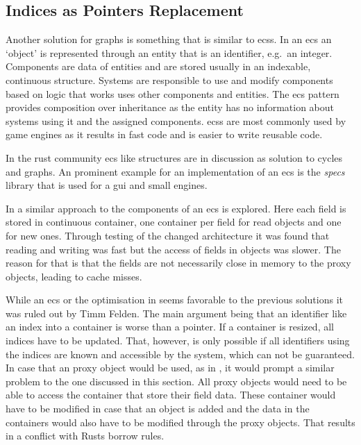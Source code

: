 \documentclass[thesis]{subfiles}
\begin{document}
  \subsection{Indices as Pointers Replacement}
    Another solution for graphs is something that is similar to \glspl{ecs}.
    In an \gls{ecs} an `object' is represented through an entity that is an identifier, e.g.~an integer.
    Components are data of entities and are stored usually in an indexable, continuous structure.
    Systems are responsible to use and modify components based on logic that works uses other components and entities.\autocite[209]{sfml}
    The \gls{ecs} pattern provides composition over inheritance as the entity has no information about systems using it and the assigned components.
    \glspl{ecs} are most commonly used by game engines as it results in fast code and is easier to write reusable code\autocites[209]{sfml}{ecs-acc-game}{ecs-hash}.

    In the rust community \gls{ecs} like structures are in discussion as solution to cycles and graphs\autocites{rust-graph-r4cpp}{rust-graph-leipzig}{rust-graph-niko}{rust-graph-exyr}.
    An prominent example for an implementation of an \gls{ecs} is the \emph{specs}\autocite{rust-specs} library that is used for a \gls{gui}\autocite{rust-xi} and small engines\autocites{rust-amethyst}{rust-rhusics}.

    In \autocite{skill-scala} a similar approach to the components of an \gls{ecs} is explored.
    Here each field is stored in continuous container, one container per field for read objects and one for new ones.
    Through testing of the changed architecture it was found that reading and writing was fast but the access of fields in objects was slower.
    The reason for that is that the fields are not necessarily close in memory to the proxy objects, leading to cache misses.
    \autocite{skill-scala}

    While an \gls{ecs} or the optimisation in \autocite{skill-scala} seems favorable to the previous solutions it was ruled out by Timm Felden.
    The main argument being that an identifier like an index into a container is worse than a pointer.
    If a container is resized, all indices have to be updated.
    That, however, is only possible if all identifiers using the indices are known and accessible by the system, which can not be guaranteed.
    In case that an proxy object would be used, as in \autocite{skill-scala}, it would prompt a similar problem to the one discussed in this section.
    All proxy objects would need to be able to access the container that store their field data.
    These container would have to be modified in case that an object is added and the data in the containers would also have to be modified through the proxy objects.
    That results in a conflict with Rusts borrow rules.
\end{document}
